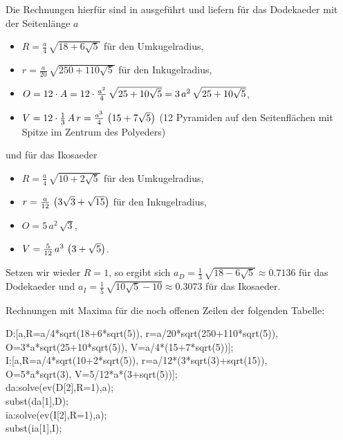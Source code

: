 \documentclass[11pt]{article}
\begin{document}
Die Rechnungen hierfür sind in \cite{Fendt1, Fendt2} ausgeführt und liefern
für das Dodekaeder mit der Seitenlänge $a$
\begin{itemize}
\item $R=\frac{a}{4}\,\sqrt{18+6\sqrt{5}}$ für den Umkugelradius,
\item $r=\frac{a}{20}\,\sqrt{250+110\sqrt{5}}$ für den Inkugelradius,
\item $O=12\cdot A=12\cdot\frac{a^2}{4}\,\sqrt{25+10\sqrt{5}}
  =3\,a^2\,\sqrt{25+10\sqrt{5}}$,
\item $V=12\cdot\frac13\,A\,r =\frac{a^3}{4}\,\left(15+7\sqrt{5}\right)$ (12 Pyramiden
  auf den Seitenflächen mit Spitze im Zentrum des Polyeders)
\end{itemize}
und für das Ikosaeder
\begin{itemize}
\item $R=\frac{a}{4}\,\sqrt{10+2\sqrt{5}}$ für den Umkugelradius,
\item $r=\frac{a}{12}\,\left(3\sqrt{3}+\sqrt{15}\right)$ für den Inkugelradius,
\item $O=5\,a^2\,\sqrt{3}$,
\item $V=\frac{5}{12}\,a^3\,\left(3+\sqrt{5}\right)$.
\end{itemize}
Setzen wir wieder $R=1$, so ergibt sich $a_D=\frac13\,\sqrt{18-6\sqrt{5}}
\approx 0.7136$ für das Dodekaeder und $a_I=\frac15\,\sqrt{10\sqrt{5}-10}
\approx 0.3073$ für das Ikosaeder. 

Rechnungen mit Maxima für die noch offenen Zeilen der folgenden Tabelle:
\begin{code}
  D:[a,R=a/4*sqrt(18+6*sqrt(5)), r=a/20*sqrt(250+110*sqrt(5)),\\\>
    O=3*a*sqrt(25+10*sqrt(5)), V=a/4*(15+7*sqrt(5))];\\[4pt]

  I:[a,R=a/4*sqrt(10+2*sqrt(5)), r=a/12*(3*sqrt(3)+sqrt(15)),\\\>
    O=5*a*sqrt(3), V=5/12*a*(3+sqrt(5))];\\

  da:solve(ev(D[2],R=1),a);\\
  subst(da[1],D);\\[4pt]

  ia:solve(ev(I[2],R=1),a);\\
  subst(ia[1],I);\\[4pt]
\end{code}
\end{document}
